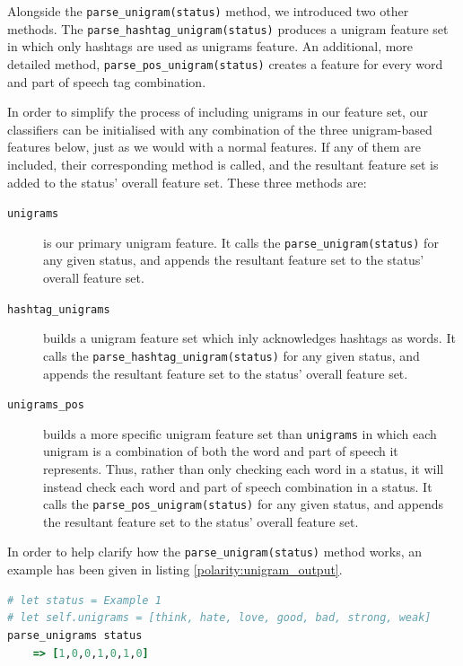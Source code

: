 Alongside the \texttt{parse\-\_unigram\-(status)} method, we introduced two other methods. The \texttt{parse\-\_hashtag\-\_unigram\-(status)} produces a unigram feature set in which only hashtags are used as unigrams feature. An additional, more detailed method, \texttt{parse\-\_pos\-\_unigram\-(status)} creates a feature for every word and part of speech tag combination.

In order to simplify the process of including unigrams in our feature set, our classifiers can be initialised with any combination of the three unigram-based features below, just as we would with a normal features. If any of them are included, their corresponding method is called, and the resultant feature set is added to the status' overall feature set. These three methods are:

\begin{description}
	\item [\texttt{unigrams}] is our primary unigram feature. It calls the \texttt{parse\-\_unigram\-(status)} for any given status, and appends the resultant feature set to the status' overall feature set.
	\item [\texttt{hashtag\_unigrams}] builds a unigram feature set which inly acknowledges hashtags as words. It calls the \texttt{parse\-\_hashtag\-\_unigram\-(status)} for any given status, and appends the resultant feature set to the status' overall feature set.
	\item [\texttt{unigrams\_pos}] builds a more specific unigram feature set than \texttt{unigrams} in which each unigram is a combination of both the word and part of speech it represents. Thus, rather than only checking each word in a status, it will instead check each word and part of speech combination in a status. It calls the \texttt{parse\-\_pos\-\_unigram\-(status)} for any given status, and appends the resultant feature set to the status' overall feature set.
\end{description}

In order to help clarify how the \texttt{parse\-\_unigram\-(status)} method works, an example has been given in listing \ref{polarity:unigram_output}.

\begin{lstlisting}[language=Ruby, caption={Unigram parsing for \emph{Example 1} using a small unigram set}, label=polarity:unigram_output]
# let status = Example 1
# let self.unigrams = [think, hate, love, good, bad, strong, weak]
parse_unigrams status
	=> [1,0,0,1,0,1,0]
\end{lstlisting}

